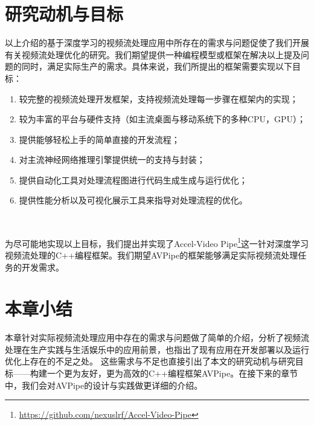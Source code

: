 \section{研究动机与目标}\label{moti_obj}
以上介绍的基于深度学习的视频流处理应用中所存在的需求与问题促使了我们开展有关视频流处理优化的研究。我们期望提供一种编程模型或框架在解决以上提及问题的同时，满足实际生产的需求。具体来说，我们所提出的框架需要实现以下目标：
\begin{enumerate}
    \item 较完整的视频流处理开发框架，支持视频流处理每一步骤在框架内的实现；
    \item 较为丰富的平台与硬件支持（如主流桌面与移动系统下的多种CPU，GPU）；
    \item 提供能够轻松上手的简单直接的开发流程；
    \item 对主流神经网络推理引擎提供统一的支持与封装；
    \item 提供自动化工具对处理流程图进行代码生成生成与运行优化；
    \item 提供性能分析以及可视化展示工具来指导对处理流程的优化。
\end{enumerate}\par~\par
为尽可能地实现以上目标，我们提出并实现了Accel-Video Pipe\footnote{\url{https://github.com/nexuslrf/Accel-Video-Pipe}}这一针对深度学习视频流处理的C++编程框架。我们期望AVPipe的框架能够满足实际视频流处理任务的开发需求。

\section{本章小结}
本章针对实际视频流处理应用中存在的需求与问题做了简单的介绍，分析了视频流处理在生产实践与生活娱乐中的应用前景，也指出了现有应用在开发部署以及运行优化上存在的不足之处。
这些需求与不足也直接引出了本文的研究动机与研究目标——构建一个更为友好，更为高效的C++编程框架AVPipe。在接下来的章节中，我们会对AVPipe的设计与实践做更详细的介绍。
